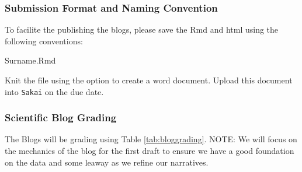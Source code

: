 {\subsubsection{Submission Format and Naming Convention}

To facilite the publishing the blogs, please save the Rmd and html using the following conventions: 

\begin{center}
Surname.Rmd
\end{center}

\noindent Knit the file using the option to create a word document. Upload this document into \texttt{Sakai} on the due date. 

\subsubsection{Scientific Blog Grading}

The Blogs will be grading using Table \ref{tab:bloggrading}. NOTE: We will focus on the mechanics of the blog for the first draft to ensure we have a good foundation on the data and some leaway as we refine our narratives. 

}
